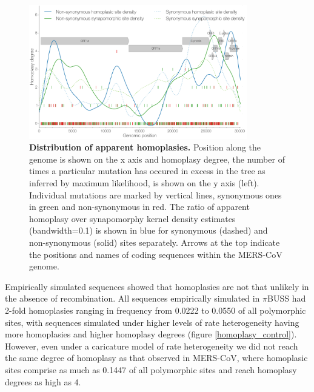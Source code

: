\documentclass[11pt,oneside,letterpaper]{article}
\begin{document}
\begin{figure}[h]
	\centering
	\includegraphics[width=0.85\textwidth]{figures/MERS_ML_homoplasyRate.png}
	\caption{\textbf{Distribution of apparent homoplasies.}
Position along the genome is shown on the x axis and homoplasy degree, the number of times a particular mutation has occured in excess in the tree as inferred by maximum likelihood, is shown on the y axis (left).
Individual mutations are marked by vertical lines, synonymous ones in green and non-synonymous in red.
The ratio of apparent homoplasy over synapomorphy kernel density estimates (bandwidth=0.1) is shown in blue for synonymous (dashed) and non-synonymous (solid) sites separately.
Arrows at the top indicate the positions and names of coding sequences within the MERS-CoV genome.}
	\label{homoplasy_densities}
\end{figure}

Empirically simulated sequences showed that homoplasies are not that unlikely in the absence of recombination.
All sequences empirically simulated in $\pi$BUSS had 2-fold homoplasies ranging in frequency from 0.0222 to 0.0550 of all polymorphic sites, with sequences simulated under higher levels of rate heterogeneity having more homoplasies and higher homoplasy degrees (figure \ref{homoplasy_control}).
However, even under a caricature model of rate heterogeneity we did not reach the same degree of homoplasy as that observed in MERS-CoV, where homoplasic sites comprise as much as 0.1447 of all polymorphic sites and reach homoplasy degrees as high as 4.
\end{document}
